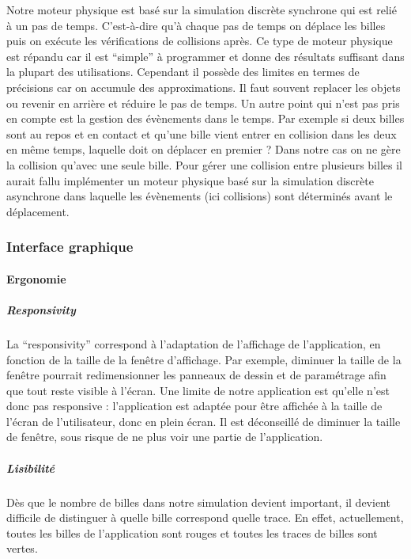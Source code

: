 \documentclass{report}
\begin{document}
Notre moteur physique est basé sur la simulation discrète synchrone qui est relié à un pas de temps. C’est-à-dire qu’à chaque pas de temps on déplace les billes puis on exécute les vérifications de collisions après. Ce type de moteur physique est répandu car il est “simple” à programmer et donne des résultats suffisant dans la plupart des utilisations. Cependant il possède des limites en termes de précisions car on accumule des approximations. Il faut souvent replacer les objets ou revenir en arrière et réduire le pas de temps. Un autre point qui n’est pas pris en compte est la gestion des évènements dans le temps. Par exemple si deux billes sont au repos et en contact et qu’une bille vient entrer en collision dans les deux en même temps, laquelle doit on déplacer en premier ? Dans notre cas on ne gère la collision qu’avec une seule bille. Pour gérer une collision entre plusieurs billes il aurait fallu implémenter un moteur physique basé sur la simulation discrète asynchrone dans laquelle les évènements (ici collisions) sont déterminés avant le déplacement.

\subsubsection{Interface graphique}

\paragraph{Ergonomie}

\subparagraph{Responsivity}

La “responsivity” correspond à l’adaptation de l’affichage de l’application, en fonction de la taille de la fenêtre d’affichage. Par exemple, diminuer la taille de la fenêtre pourrait redimensionner les panneaux de dessin et de paramétrage afin que tout reste visible à l’écran.
Une limite de notre application est qu’elle n’est donc pas responsive : l’application est adaptée pour être affichée à la taille de l’écran de l’utilisateur, donc en plein écran. Il est déconseillé de diminuer la taille de fenêtre, sous risque de ne plus voir une partie de l’application.

\subparagraph{Lisibilité}

Dès que le nombre de billes dans notre simulation devient important, il devient difficile de distinguer à quelle bille correspond quelle trace. En effet, actuellement, toutes les billes de l’application sont rouges et toutes les traces de billes sont vertes.
\end{document}
